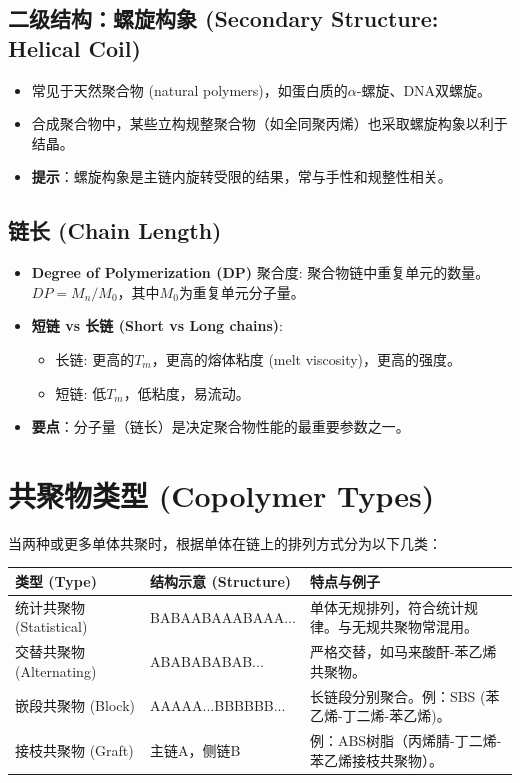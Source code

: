 \documentclass[12pt,a4paper]{ctexart}
\begin{document}
\subsection{二级结构：螺旋构象 (Secondary Structure: Helical Coil)}
\begin{itemize}
    \item 常见于天然聚合物 (natural polymers)，如蛋白质的$\alpha$-螺旋、DNA双螺旋。
    \item 合成聚合物中，某些立构规整聚合物（如全同聚丙烯）也采取螺旋构象以利于结晶。
    \item \textbf{提示}：螺旋构象是主链内旋转受限的结果，常与手性和规整性相关。
\end{itemize}

\subsection{链长 (Chain Length)}
\begin{itemize}
    \item \textbf{Degree of Polymerization (DP)} 聚合度: 聚合物链中重复单元的数量。$DP = M_n / M_0$，其中$M_0$为重复单元分子量。
    \item \textbf{短链 vs 长链 (Short vs Long chains)}:
    \begin{itemize}
        \item 长链: 更高的$T_m$，更高的熔体粘度 (melt viscosity)，更高的强度。
        \item 短链: 低$T_m$，低粘度，易流动。
    \end{itemize}
    \item \textbf{要点}：分子量（链长）是决定聚合物性能的最重要参数之一。
\end{itemize}

\section{共聚物类型 (Copolymer Types)}

当两种或更多单体共聚时，根据单体在链上的排列方式分为以下几类：

\begin{longtable}{p{4cm}p{5cm}p{5cm}}
\toprule
\textbf{类型 (Type)} & \textbf{结构示意 (Structure)} & \textbf{特点与例子} \\
\midrule
统计共聚物 (Statistical) & BABAABAAABAAA... & 单体无规排列，符合统计规律。与无规共聚物常混用。 \\
交替共聚物 (Alternating) & ABABABABAB... & 严格交替，如马来酸酐-苯乙烯共聚物。 \\
嵌段共聚物 (Block) & AAAAA...BBBBBB... & 长链段分别聚合。例：SBS (苯乙烯-丁二烯-苯乙烯)。 \\
接枝共聚物 (Graft) & 主链A，侧链B & 例：ABS树脂（丙烯腈-丁二烯-苯乙烯接枝共聚物）。 \\
\bottomrule
\end{longtable}
\end{document}
